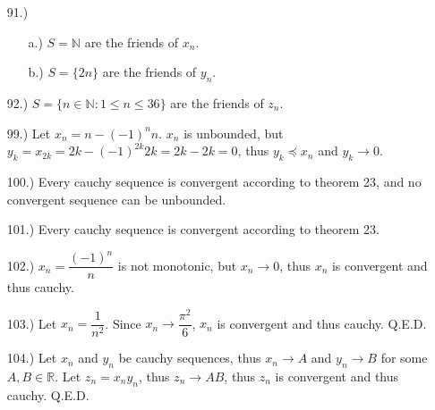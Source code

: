 \documentclass[12pt]{article}
\begin{document}
\begin{itemize}


    \item [91.)] \begin{itemize}
        \item [a.)] $S=\mathbb{N}$ are the friends of $x_n$.

    \item [b.)] $S=\{2n\}$ are the friends of $y_n$.
    \end{itemize}

    \item [92.)] $S=\{n\in\mathbb{N}:1\leq n\leq36\}$ are the friends of $z_n$.






    \item [99.)] Let $x_n=n-(-1)^nn$. $x_n$ is unbounded, but $y_k=x_{2k}=2k-(-1)^{2k}2k=2k-2k=0$, thus $y_k\preceq x_n$ and $y_k\to0$.

    \item [100.)] Every cauchy sequence is convergent according to theorem 23, and no convergent sequence can be unbounded.

    \item [101.)] Every cauchy sequence is convergent according to theorem 23.

    \item [102.)] $x_n=\dfrac{(-1)^n}{n}$ is not monotonic, but $x_n\to0$, thus $x_n$ is convergent and thus cauchy.

    \item [103.)] Let $x_n=\dfrac{1}{n^2}$. Since $x_n\to\dfrac{\pi^2}{6}$, $x_n$ is convergent and thus cauchy. Q.E.D.

    \item [104.)] Let $x_n$ and $y_n$ be cauchy sequences, thus $x_n\to A$ and $y_n\to B$ for some $A,B\in\mathbb{R}$. Let $z_n=x_ny_n$, thus $z_n\to AB$, thus $z_n$ is convergent and thus cauchy. Q.E.D.


\end{itemize}
\end{document}
